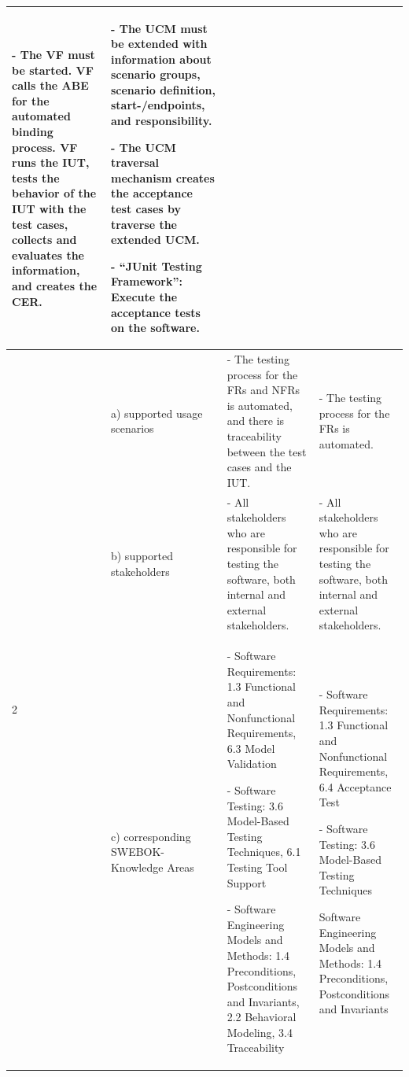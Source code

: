 \begin{landscape}
\begin{small}
\begin{table}
\begin{longtable}[h]{p{1.3cm}|>{\raggedright}p{2.8cm}|>{}p{9.1cm}|>{}p{9.1cm}}
			- The VF must be started. VF calls the ABE for the automated binding process. VF runs the IUT, tests the behavior of the IUT with the test cases, collects and evaluates the information, and creates the CER.
			&
			- The UCM must be extended with information about scenario groups, scenario definition, start-/endpoints, and responsibility.
			
			- The UCM traversal mechanism creates the acceptance test cases by traverse the extended UCM.
			
			- \enquote{JUnit Testing Framework}: Execute the acceptance tests on the software.
			\\
			\hline %
			\multirow{3}{*}{2 \rotatebox[origin=r]{90}{\textbf{Benefits}}} 
			& a) supported usage scenarios 
			& - The testing process for the FRs and NFRs is automated, and there is traceability between the test cases and the IUT. 
			& - The testing process for the FRs is automated. \\ 
			\cline{2-4}
			& b) supported stakeholders 
			& - All stakeholders who are responsible for testing the software, both internal and external stakeholders.
			& - All stakeholders who are responsible for testing the software, both internal and external stakeholders.\\ 
			\cline{2-4}
			& c) corresponding SWEBOK-Knowledge Areas
			& - Software Requirements: 1.3 Functional and Nonfunctional Requirements, 6.3 Model Validation
			
			- Software Testing: 3.6 Model-Based Testing Techniques, 6.1 Testing Tool Support
			
			- Software Engineering Models and Methods: 1.4 Preconditions, Postconditions and Invariants, 2.2 Behavioral Modeling, 3.4 Traceability 
			&
			- Software Requirements: 1.3 Functional and Nonfunctional Requirements, 6.4 Acceptance Test
			
			- Software Testing: 3.6 Model-Based Testing Techniques
			
			Software Engineering Models and Methods: 1.4 Preconditions, Postconditions and Invariants\\
			\hline %
		\end{longtable}
		\label{tab:08_syntheseMatrix1}
	\end{table}
	\end{small}
\end{landscape}
\restoregeometry

